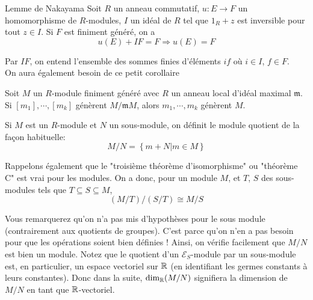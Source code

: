 \documentclass[memoire.tex]{subfiles}
\begin{document}
\begin{theobox}{Lemme de Nakayama}{}\label{Nakayama}
    Soit $R$ un anneau commutatif, $u:E\rightarrow F$ un homomorphisme de $R$-modules, $I$ un idéal de $R$ tel que $1_{R}+z$ est inversible pour tout $z\in I$.
    Si $F$ est finiment généré, on a 
    \begin{equation*}
        u(E)+ IF=F\Rightarrow u(E)=F
    \end{equation*}
\end{theobox}
Par $IF$, on entend l'ensemble des sommes finies d’éléments $if$ où $i\in I$, $f\in F$.\\
On aura également besoin de ce petit corollaire
\begin{corollaire}\label{corrNakayama}
    Soit $M$ un $R$-module finiment généré avec $R$ un anneau local d'idéal maximal $\mathfrak{m}$. Si $[m_1],\cdots,[m_k]$ génèrent $M/\mathfrak{m}M$, alors 
    $m_1,\cdots,m_k$ génèrent $M$.
\end{corollaire}
\begin{definition}
    Si $M$ est un $R$-module et $N$ un sous-module, on définit le module quotient de la façon habituelle:
    \begin{equation*}
        M/N=\left\{ m+N | m\in M \right\}
    \end{equation*}
\end{definition}
 Rappelons également que le "troisième théorème 
 d'isomorphisme" ou "théorème C" est vrai pour les modules. 
 On a donc, pour un module $M$, et $T$, $S$ des sous-modules 
 tels que $T\subseteq S\subseteq M$,
\begin{equation*}
    (M/T)/(S/T)\cong M/S
\end{equation*}

Vous remarquerez qu'on n'a pas mis 
d'hypothèses pour le sous 
module (contrairement aux 
quotients de groupes). C'est 
parce 
qu'on n'en a pas besoin pour que les opérations soient bien 
définies ! Ainsi, on vérifie facilement que $M/N$ est bien 
un module. Notez que le quotient d'un $\mathcal{E}_S
$-module par un sous-module est, en 
particulier, un espace 
vectoriel sur $\mathbb{R}$ (en identifiant  les 
germes constants à 
leurs constantes). Donc dans la suite, $\dim_{\mathbb{R}} (M/N)$ 
signifiera la dimension de $M/N$ en tant que $\mathbb{R}$-vectoriel.
\\
\end{document}

